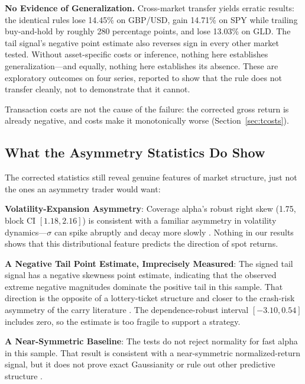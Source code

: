 \documentclass[11pt]{article}
\begin{document}
\textbf{No Evidence of Generalization.} Cross-market transfer yields erratic results: the identical rules lose 14.45\% on GBP/USD, gain 14.71\% on SPY while trailing buy-and-hold by roughly 280 percentage points, and lose 13.03\% on GLD. The tail signal's negative point estimate also reverses sign in every other market tested. Without asset-specific costs or inference, nothing here establishes generalization---and equally, nothing here establishes its absence. These are exploratory outcomes on four series, reported to show that the rule does not transfer cleanly, not to demonstrate that it cannot.

Transaction costs are not the cause of the failure: the corrected gross return is already negative, and costs make it monotonically worse (Section~\ref{sec:tcosts}).

\subsection{What the Asymmetry Statistics Do Show}

The corrected statistics still reveal genuine features of market structure, just not the ones an asymmetry trader would want:

\textbf{Volatility-Expansion Asymmetry}: Coverage alpha's robust right skew (1.75, block CI $[1.18, 2.16]$) is consistent with a familiar asymmetry in volatility dynamics---$\sigma$ can spike abruptly and decay more slowly \citep{bollerslev1986generalized, engle1982autoregressive}. Nothing in our results shows that this distributional feature predicts the direction of spot returns.

\textbf{A Negative Tail Point Estimate, Imprecisely Measured}: The signed tail signal has a negative skewness point estimate, indicating that the observed extreme negative magnitudes dominate the positive tail in this sample. That direction is the opposite of a lottery-ticket structure \citep{kumar2009gambles, bali2011maxing} and closer to the crash-risk asymmetry of the carry literature \citep{brunnermeier2009carry, burnside2011carry}. The dependence-robust interval $[-3.10, 0.54]$ includes zero, so the estimate is too fragile to support a strategy.

\textbf{A Near-Symmetric Baseline}: The tests do not reject normality for fast alpha in this sample. That result is consistent with a near-symmetric normalized-return signal, but it does not prove exact Gaussianity or rule out other predictive structure \citep{moskowitz2012time}.
\end{document}
